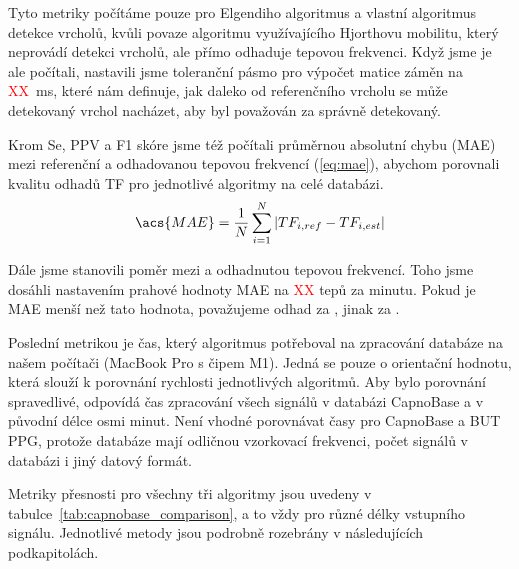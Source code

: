 Tyto metriky počítáme pouze pro Elgendiho algoritmus a vlastní algoritmus detekce vrcholů, kvůli povaze algoritmu využívajícího Hjorthovu mobilitu, který neprovádí detekci vrcholů, ale přímo odhaduje tepovou frekvenci.
Když jsme je ale počítali, nastavili jsme toleranční pásmo pro výpočet matice záměn na \textcolor{red}{XX}~ms, které nám definuje, jak daleko od referenčního vrcholu se může detekovaný vrchol nacházet, aby byl považován za správně detekovaný.

Krom \acs{Se}, \acs{PPV} a \acs{F1} skóre jsme též počítali průměrnou absolutní chybu (\acs{MAE}) mezi referenční a odhadovanou tepovou frekvencí (\ref{eq:mae}), abychom porovnali kvalitu odhadů \acs{TF} pro jednotlivé algoritmy na celé databázi.
\begin{equation}
	\label{eq:mae}
	\acs{MAE} = \frac{1}{N} \sum_{i=1}^{N} |TF_{i,ref} - TF_{i,est}|
\end{equation}

Dále jsme stanovili poměr mezi  a  odhadnutou tepovou frekvencí.
Toho jsme dosáhli nastavením prahové hodnoty \acs{MAE} na \textcolor{red}{XX} tepů za minutu.
Pokud je \acs{MAE} menší než tato hodnota, považujeme odhad za , jinak za .

Poslední metrikou je čas, který algoritmus potřeboval na zpracování databáze na našem počítači (MacBook Pro s čipem M1).
Jedná se pouze o orientační hodnotu, která slouží k porovnání rychlosti jednotlivých algoritmů.
Aby bylo porovnání spravedlivé, odpovídá čas zpracování všech signálů v databázi CapnoBase a v původní délce osmi minut.
Není vhodné porovnávat časy pro CapnoBase a \acs{BUT PPG}, protože databáze mají odličnou vzorkovací frekvenci, počet signálů v databázi i jiný datový formát.

Metriky přesnosti pro všechny tři algoritmy jsou uvedeny v tabulce~\ref{tab:capnobase_comparison}, a to vždy pro různé délky vstupního signálu.
Jednotlivé metody jsou podrobně rozebrány v následujících podkapitolách.

